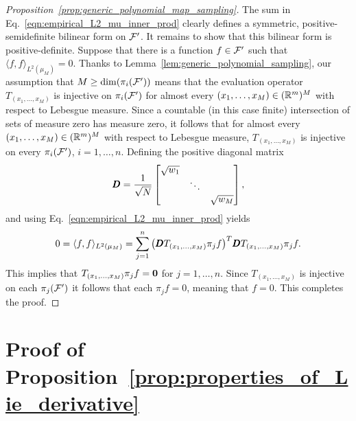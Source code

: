 \documentclass[twoside,11pt]{article}
\begin{document}
\begin{proof}[Proposition~\ref{prop:generic_polynomial_map_sampling}]
    The sum in Eq.~\ref{eqn:empirical_L2_mu_inner_prod} clearly defines a symmetric, positive-semidefinite bilinear form on ${\mathcal{F}}'$.
    It remains to show that this bilinear form is positive-definite.
    Suppose that there is a function $f \in {\mathcal{F}}'$ such that $\langle f, f\rangle_{L^2(\mu_M)} = 0$.
    Thanks to Lemma~\ref{lem:generic_polynomial_sampling}, our assumption that $M \geq \dim(\pi_i({\mathcal{F}}'))$ means that the evaluation operator $T_{(x_1, \ldots, x_M)}$ is injective on $\pi_i({\mathcal{F}}')$ for almost every $(x_1, \ldots, x_M) \in (\mathbb{R}^m)^M$ with respect to Lebesgue measure.
    Since a countable (in this case finite) intersection of sets of measure zero has measure zero, it follows that for almost every $(x_1, \ldots, x_M) \in (\mathbb{R}^m)^M$ with respect to Lebesgue measure, $T_{(x_1, \ldots, x_M)}$ is injective on every $\pi_i({\mathcal{F}}')$, $i=1, \ldots, n$.
    Defining the positive diagonal matrix
    \begin{equation}
        {\pmb{D}} = \frac{1}{\sqrt{N}} \begin{bmatrix}
            \sqrt{w_1} & & \\
            & \ddots & \\
            & & \sqrt{w_M}
        \end{bmatrix},
    \end{equation}
    and using Eq.~\ref{eqn:empirical_L2_mu_inner_prod} yields
    \begin{equation}
        0 = \langle f, f\rangle_{L^2(\mu_M)} = \sum_{j=1}^{n} \big({\pmb{D}} T_{(x_1, \ldots, x_M)} \pi_j f\big)^T {\pmb{D}} T_{(x_1, \ldots, x_M)} \pi_j f .
    \end{equation}
    This implies that $T_{(x_1, \ldots, x_M)} \pi_j f = {\boldsymbol{0}}$ for $j=1, \ldots, n$.
    Since $T_{(x_1, \ldots, x_M)}$ is injective on each $\pi_j({\mathcal{F}}')$ it follows that each $\pi_j f = 0$, meaning that $f = 0$.
    This completes the proof.
\end{proof}

\section{Proof of Proposition~\ref{prop:properties_of_Lie_derivative}}
\label{app:properties_of_Lie_derivative}
\end{document}
